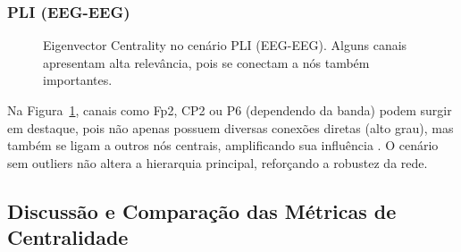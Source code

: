 \subsubsection{PLI (EEG-EEG)}
\begin{figure}[htb]
    \centering
    \quad
    \caption{Eigenvector Centrality no cenário PLI (EEG-EEG). Alguns canais apresentam alta relevância, pois se conectam a nós também importantes.}
    \label{fig:ec_pli_eegeeg}
\end{figure}

Na Figura~\ref{fig:ec_pli_eegeeg}, canais como Fp2, CP2 ou P6 (dependendo da banda) podem surgir em destaque, pois não apenas possuem diversas conexões diretas (alto grau), mas também se ligam a outros nós centrais, amplificando sua influência \cite{bonacich1972factoring}. O cenário sem outliers não altera a hierarquia principal, reforçando a robustez da rede.

\subsection{Discussão e Comparação das Métricas de Centralidade}
\label{subsec:discuss_centrality_metrics}


